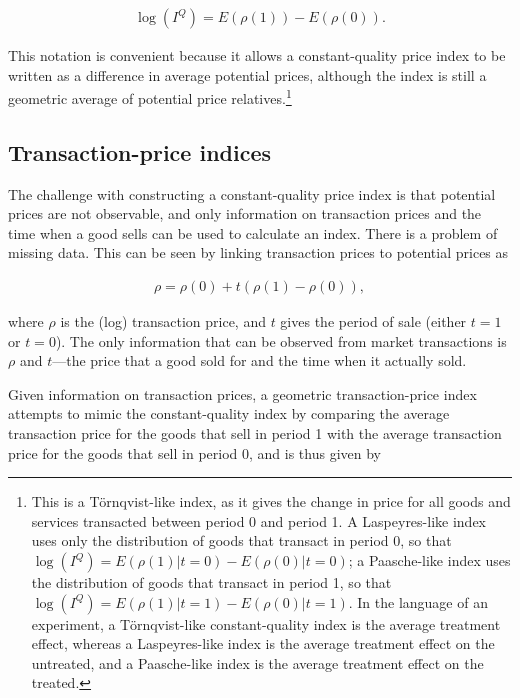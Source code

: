 \documentclass[]{article}
\begin{document}
\begin{align*}
\log(I^{Q}) = E(\rho(1)) - E(\rho(0)).
\end{align*}

This notation is convenient because it allows a constant-quality price index to be written as a difference in average potential prices, although the index is still a geometric average of potential price relatives.\footnote{This is a Törnqvist-like index, as it gives the change in price for all goods and services transacted between period 0 and period 1. A Laspeyres-like index uses only the distribution of goods that transact in period 0, so that \(\log(I^{Q}) = E(\rho(1) | t = 0) - E(\rho(0) | t = 0)\); a Paasche-like index uses the distribution of goods that transact in period 1, so that \(\log(I^{Q}) = E(\rho(1) | t = 1) - E(\rho(0) | t = 1)\). In the language of an experiment, a Törnqvist-like constant-quality index is the average treatment effect, whereas a Laspeyres-like index is the average treatment effect on the untreated, and a Paasche-like index is the average treatment effect on the treated.}

\hypertarget{transaction-price-indices}{%
\subsection{Transaction-price indices}\label{transaction-price-indices}}

The challenge with constructing a constant-quality price index is that potential prices are not observable, and only information on transaction prices and the time when a good sells can be used to calculate an index. There is a problem of missing data. This can be seen by linking transaction prices to potential prices as

\begin{align*}
\rho = \rho(0) + t(\rho(1) - \rho(0)),
\end{align*}

where \(\rho\) is the (log) transaction price, and \(t\) gives the period of sale (either \(t = 1\) or \(t = 0\)). The only information that can be observed from market transactions is \(\rho\) and \(t\)---the price that a good sold for and the time when it actually sold.

Given information on transaction prices, a geometric transaction-price index attempts to mimic the constant-quality index by comparing the average transaction price for the goods that sell in period 1 with the average transaction price for the goods that sell in period 0, and is thus given by
\end{document}

